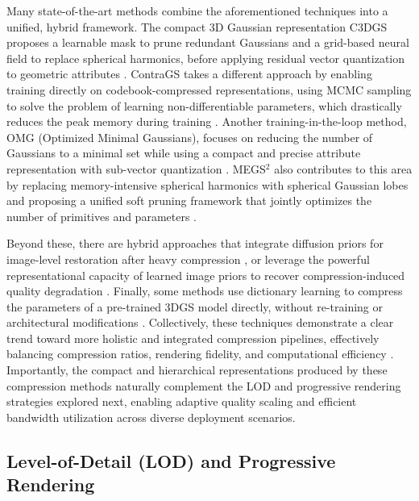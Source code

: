 \documentclass[11pt]{article}
\begin{document}
Many state-of-the-art methods combine the aforementioned techniques into a unified, hybrid framework. The compact 3D Gaussian representation C3DGS proposes a learnable mask to prune redundant Gaussians and a grid-based neural field to replace spherical harmonics, before applying residual vector quantization to geometric attributes \cite{ref98,ref97}. ContraGS takes a different approach by enabling training directly on codebook-compressed representations, using MCMC sampling to solve the problem of learning non-differentiable parameters, which drastically reduces the peak memory during training \cite{ref445}. Another training-in-the-loop method, OMG (Optimized Minimal Gaussians), focuses on reducing the number of Gaussians to a minimal set while using a compact and precise attribute representation with sub-vector quantization \cite{ref446}. MEGS\(^2\) also contributes to this area by replacing memory-intensive spherical harmonics with spherical Gaussian lobes and proposing a unified soft pruning framework that jointly optimizes the number of primitives and parameters \cite{ref447}.

Beyond these, there are hybrid approaches that integrate diffusion priors for image-level restoration after heavy compression \cite{ref448}, or leverage the powerful representational capacity of learned image priors to recover compression-induced quality degradation \cite{ref449}. Finally, some methods use dictionary learning to compress the parameters of a pre-trained 3DGS model directly, without re-training or architectural modifications \cite{ref450}. Collectively, these techniques demonstrate a clear trend toward more holistic and integrated compression pipelines, effectively balancing compression ratios, rendering fidelity, and computational efficiency \cite{ref451}. Importantly, the compact and hierarchical representations produced by these compression methods naturally complement the LOD and progressive rendering strategies explored next, enabling adaptive quality scaling and efficient bandwidth utilization across diverse deployment scenarios.

\subsection{Level-of-Detail (LOD) and Progressive Rendering}
\end{document}
